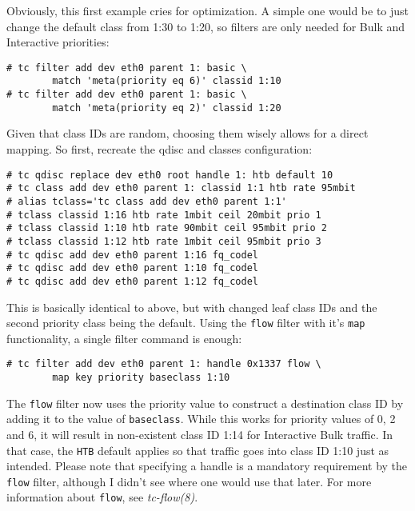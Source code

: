 \documentclass[12pt,twoside]{article}
\newcommand{\man}{\textit}
\newcommand{\qdisc}{\texttt}
\newcommand{\filter}{\texttt}
\begin{document}
Obviously, this first example cries for optimization. A simple one would be to
just change the default class from 1:30 to 1:20, so filters are only needed for
Bulk and Interactive priorities:
\begin{Verbatim}
# tc filter add dev eth0 parent 1: basic \
        match 'meta(priority eq 6)' classid 1:10
# tc filter add dev eth0 parent 1: basic \
        match 'meta(priority eq 2)' classid 1:20
\end{Verbatim}
Given that class IDs are random, choosing them wisely allows for a direct
mapping. So first, recreate the qdisc and classes configuration:
\begin{Verbatim}
# tc qdisc replace dev eth0 root handle 1: htb default 10
# tc class add dev eth0 parent 1: classid 1:1 htb rate 95mbit
# alias tclass='tc class add dev eth0 parent 1:1'
# tclass classid 1:16 htb rate 1mbit ceil 20mbit prio 1
# tclass classid 1:10 htb rate 90mbit ceil 95mbit prio 2
# tclass classid 1:12 htb rate 1mbit ceil 95mbit prio 3
# tc qdisc add dev eth0 parent 1:16 fq_codel
# tc qdisc add dev eth0 parent 1:10 fq_codel
# tc qdisc add dev eth0 parent 1:12 fq_codel
\end{Verbatim}
This is basically identical to above, but with changed leaf class IDs and the
second priority class being the default. Using the \filter{flow} filter with it's \texttt{map}
functionality, a single filter command is enough:
\begin{Verbatim}
# tc filter add dev eth0 parent 1: handle 0x1337 flow \
        map key priority baseclass 1:10
\end{Verbatim}
The \filter{flow} filter now uses the priority value to construct a destination class ID
by adding it to the value of \texttt{baseclass}. While this works for priority values of
0, 2 and 6, it will result in non-existent class ID 1:14 for Interactive Bulk
traffic. In that case, the \qdisc{HTB} default applies so that traffic goes into class
ID 1:10 just as intended. Please note that specifying a handle is a mandatory
requirement by the \filter{flow} filter, although I didn't see where one would use that
later. For more information about \filter{flow}, see \man{tc-flow(8)}.
\end{document}
